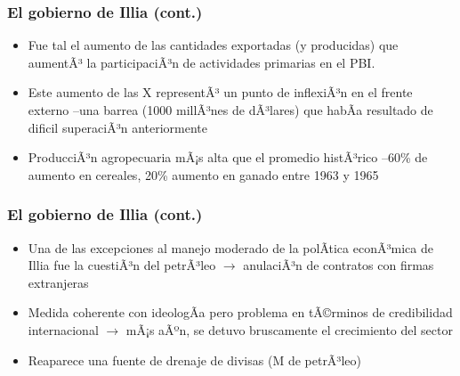 \documentclass[14pt,aspectratio=169]{beamer}
\begin{document}
  
               \begin{frame}\frametitle{El gobierno de Illia (cont.)}
                 \begin{itemize}\itemsep 5pt \medskip
                 \item Fue tal el aumento de las cantidades exportadas
                   (y producidas) que aumentÃ³ la participaciÃ³n de
                   actividades primarias en el PBI.
                   \item Este aumento de las X representÃ³ un punto de
                     inflexiÃ³n en el frente externo --una barrea (1000
                     millÃ³nes de dÃ³lares) que habÃ­a resultado de
                     dificil superaciÃ³n anteriormente
                     \item ProducciÃ³n agropecuaria mÃ¡s alta que el
                       promedio histÃ³rico --60\% de aumento en
                       cereales, 20\% aumento en ganado entre 1963 y 1965
                   \end{itemize}
                 \end{frame}


                   \begin{frame}\frametitle{El gobierno de Illia (cont.)}
                 \begin{itemize}\itemsep 5pt \medskip
                 \item Una de las excepciones al manejo moderado de la
                   polÃ­tica econÃ³mica de Illia fue la cuestiÃ³n del
                   petrÃ³leo $\longrightarrow$ anulaciÃ³n de contratos
                   con firmas extranjeras
                   \item Medida coherente con ideologÃ­a pero problema
                     en tÃ©rminos de credibilidad internacional
                     $\longrightarrow$ mÃ¡s aÃºn, se detuvo bruscamente el
                     crecimiento del sector
                     \item Reaparece una fuente de drenaje de divisas
                       (M de petrÃ³leo)
                   \end{itemize}
               \end{frame}
\end{document}
